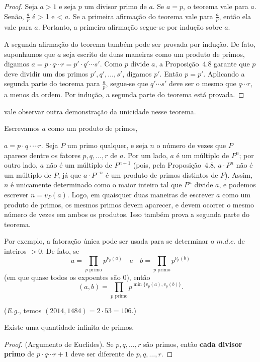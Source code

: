 \begin{proof}
Seja $a > 1$ e seja $p$ um divisor primo de $a$. 
Se $a = p$, o teorema vale para $a$. 
Senão, $\frac{a}{p}$ é > 1 e < $a$. 
Se a primeira afirmação do teorema vale para $\frac{a}{p}$, então ela vale para $a$. 
Portanto, a primeira afirmação segue-se por indução sobre $a$.

A segunda afirmação do teorema também pode ser provada por indução. 
De fato, suponhamos que $a$ seja escrito de duas maneiras como um produto de primos, 
digamos $a = p \cdot q \cdots r = p' \cdot q' \cdots s'$.
Como $p$ divide $a$, a Proposição~4.8 garante que $p$ deve dividir um dos primos 
$p', q', \ldots, s'$, digamos $p'$. Então $p = p'$. 
Aplicando a segunda parte do teorema para $\frac{a}{p}$, segue-se que 
$q' \cdots s'$ deve ser o mesmo que $q \cdots r$, a menos da ordem. 
Por indução, a segunda parte do teorema está provada.
\end{proof}

vale observar outra demonstração da unicidade nesse teorema. 

Escrevamos $a$ como um produto de primos,

$a = p \cdot q \cdot \cdots r$.
Seja $P$ um primo qualquer, e seja $n$ o número de vezes que $P$ aparece dentre os 
fatores $p, q, \ldots, r$ de $a$. 
Por um lado, $a$ é um múltiplo de $P^n$; por outro lado, $a$ não é um múltiplo de 
$P^{n+1}$ (pois, pela Proposição~4.8, $a \cdot P^n$ não é um múltiplo de $P$, já que $a \cdot P^{-n}$ 
é um produto de primos distintos de $P$). 
Assim, $n$ é unicamente determinado como o maior inteiro tal que $P^n$ divide $a$, 
e podemos escrever $n = v_P(a)$. 
Logo, em quaisquer duas maneiras de escrever $a$ como um produto de primos, 
os mesmos primos devem aparecer, e devem ocorrer o mesmo número de vezes em ambos os produtos. 
Isso também prova a segunda parte do teorema.

Por exemplo, a fatoração única pode ser usada para se determinar o $m.d.c.$ 
de inteiros $> 0$. De fato, se
\[
a = \prod_{p \text{ primo}} p^{\nu_p(a)}
\quad \text{e} \quad
b = \prod_{p \text{ primo}} p^{\nu_p(b)}
\]
(em que quase todos os expoentes são $0$), então
\[
(a,b) = \prod_{p \text{ primo}} p^{\min\{v_p(a), v_p(b)\}}.
\]

(\textit{E.g.}, temos $(2014,1484) = 2 \cdot 53 = 106$.)

\begin{teorema}
Existe uma quantidade infinita de primos.
\end{teorema}

\begin{proof}
(Argumento de Euclides). Se $p, q, \ldots , r$ são primos, então \textbf{cada divisor primo} de $p \cdot q \cdots r +1$
deve ser diferente de $p, q, \ldots , r$.
\end{proof}
